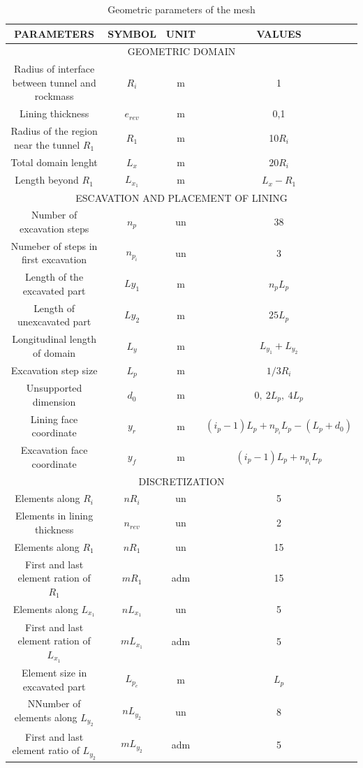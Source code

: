 \documentclass[Journal,letterpaper]{ascelike-new}
\begin{document}
\begin{table}
	\caption{Geometric parameters of the mesh}
	\label{parametros_AXI}
	\centering
	\small
	\renewcommand{\arraystretch}{1.25}
	\begin{tabular}{c c c c}
		\hline
		\multicolumn{1}{c}{\textbf{PARAMETERS}} &
		\multicolumn{1}{c}{\textbf{SYMBOL}} &
		\multicolumn{1}{c}{\textbf{UNIT}} &
		\multicolumn{1}{c}{\textbf{VALUES}} \\
		\hline
		\multicolumn{4}{c}{GEOMETRIC DOMAIN} \\
		\hline
		Radius of interface between tunnel and rockmass & $R_i$ & m & 1 \\		
		Lining thickness & $e_{rev}$ & m & 0,1 \\
		Radius of the region near the tunnel $R_1$ & $R_1$ & m & 10$R_{i}$ \\
		Total domain lenght & $L_{x}$ & m & $20R_i$ \\		
		Length beyond $R_1$ & $L_{x_1}$ & m & $L_x - R_1$ \\							
		\hline
		\multicolumn{4}{c}{ESCAVATION AND PLACEMENT OF LINING} \\
		\hline
		Number of excavation steps & $n_p$ & un & 38 \\
		Numeber of steps in first excavation & $n_{p_i}$ & un & 3 \\
		Length of the excavated part & $Ly_{1}$ & m & $n_pL_p$ \\
		Length of unexcavated part & $Ly_{2}$ & m & $25L_p$ \\
		Longitudinal length of domain & $L_y$ & m & $L_{y_1}+L_{y_2}$ \\
		Excavation step size & $L_{p}$ & m & $1/3R_{i}$ \\
		Unsupported dimension & $d_0$ & m & $0,~2L_{p},~4L_{p}$ \\
		Lining face coordinate & $y_r$ & m & $(i_p-1)L_p + n_{p_i}L_p - (L_p+d_0)$ \\
		Excavation face coordinate & $y_f$ & m & $(i_p-1)L_p + n_{p_i}L_p$ \\
		\hline
		\multicolumn{4}{c}{DISCRETIZATION} \\
		\hline
		Elements along $R_i$ & $nR_{i}$ & un & 5 \\	
		Elements in lining thickness & $n_{rev}$ & un & 2 \\			
		Elements along $R_1$ & $nR_{1}$ & un & 15 \\	
		First and last element ration of $R_1$ & $mR_{1}$ & adm & 15 \\	
		Elements along $L_{x_1}$ & $nL_{x_1}$ & un & 5 \\
		First and last element ration of $L_{x_1}$ & $mL_{x_1}$ & adm & 5 \\				
		Element size in excavated part & $L_{p_e}$ & m & $L_{p}$ \\	
		NNumber of elements along $L_{y_2}$ & $nL_{y_2}$ & un & 8 \\			
		First and last element ratio of $L_{y_2}$ & $mL_{y_2}$ & adm & 5 \\				
		\hline
	\end{tabular}
	\normalsize
\end{table}
\end{document}
